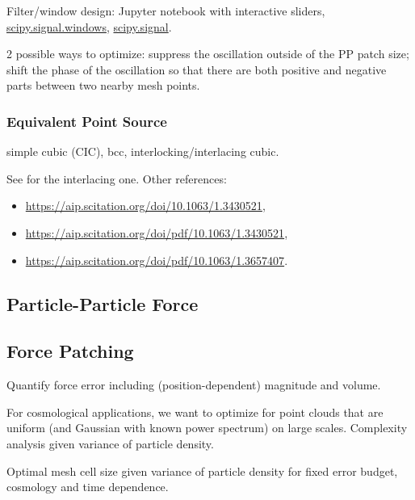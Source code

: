 \documentclass[a4paper]{article}
\newcommand{\1}{\mathds{1}}
\newcommand{\YL}[1]{\textcolor{Bittersweet}{#1}}
\begin{document}
\YL{Filter/window design: Jupyter notebook with interactive sliders,
\href{https://docs.scipy.org/doc/scipy/reference/signal.windows.html}{scipy.signal.windows},
\href{https://docs.scipy.org/doc/scipy/reference/signal.html}{scipy.signal}.
}


\YL{2 possible ways to optimize:
suppress the oscillation outside of the PP patch size;
shift the phase of the oscillation so that there are both positive and
negative parts between two nearby mesh points.
}


\subsubsection{Equivalent Point Source}

simple cubic (CIC), bcc, interlocking/interlacing cubic.
\YL{See \citet{HockneyEastwood1988} for the interlacing one.
Other references:
\begin{itemize}
\item \url{https://aip.scitation.org/doi/10.1063/1.3430521},
\item \url{https://aip.scitation.org/doi/pdf/10.1063/1.3430521},
\item \url{https://aip.scitation.org/doi/pdf/10.1063/1.3657407}.
\end{itemize}
}



\subsection{Particle-Particle Force}



\subsection{Force Patching}


\YL{Quantify force error including (position-dependent) magnitude and
volume.}


For cosmological applications, we want to optimize for point clouds that
are uniform (and Gaussian with known power spectrum) on large scales.
\YL{Complexity analysis given variance of particle density.}


\YL{Optimal mesh cell size given variance of particle density for fixed
error budget, cosmology and time dependence.}
\end{document}
